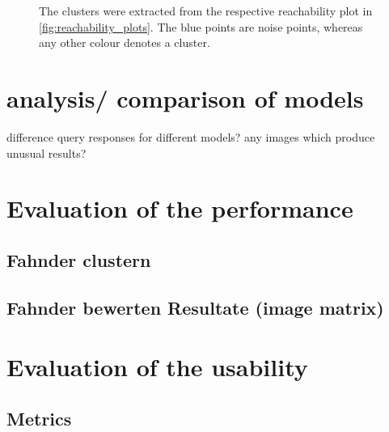 \begin{figure}%
    \centering
    \qquad
    \caption{The clusters were extracted from the respective reachability plot in \autoref{fig:reachability_plots}.
    The blue points are noise points, whereas any other colour denotes a cluster.}%
    \label{fig:optics_cluster}%
\end{figure}


\section{analysis/ comparison of models}\label{sec:evaluation-models}
difference query responses for different models?
any images which produce unusual results?

\section{Evaluation of the performance}\label{sec:evaluation-performance}

\subsection{Fahnder clustern}\label{subsec:evaluation-metric1}

\subsection{Fahnder bewerten Resultate (image matrix)}\label{subsec:evaluation-metric2}

\section{Evaluation of the usability}\label{sec:evaluation-usability}

\subsection{Metrics}\label{subsec:evaluation-metrics}